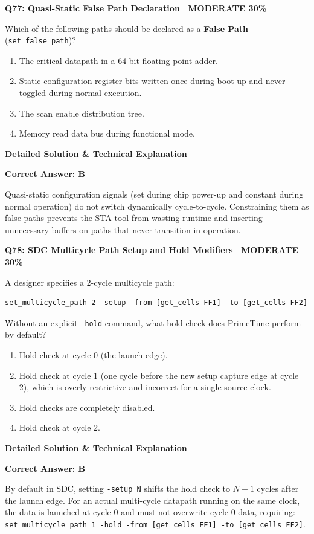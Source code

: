 \documentclass[11pt,a4paper]{article}
\newcommand{\badgemod}{{\color{white}\colorbox{modoran}{\bfseries\sffamily\tiny\ MODERATE 30\%\ }}}
\newenvironment{qbox}[2]{%
  \begin{mdframed}[style=qstyle]%
  {\bfseries\sffamily\color{primaryblue}#1 \hfill #2}\par\vspace{2pt}%
}{%
  \end{mdframed}%
}
\newenvironment{ansbox}{%
  \begin{mdframed}[style=ansstyle]%
  {\bfseries\sffamily\color{ansgreen}\small Detailed Solution \& Technical Explanation}\par\vspace{2pt}\small%
}{%
  \end{mdframed}%
}
\begin{document}
\begin{qbox}{Q77: Quasi-Static False Path Declaration}{\badgemod}
Which of the following paths should be declared as a \textbf{False Path} (\texttt{set\_false\_path})?
\begin{enumerate}[label=\textbf{\Alph*.}]
  \item The critical datapath in a 64-bit floating point adder.
  \item Static configuration register bits written once during boot-up and never toggled during normal execution.
  \item The scan enable distribution tree.
  \item Memory read data bus during functional mode.
\end{enumerate}
\end{qbox}
\begin{ansbox}
\textbf{Correct Answer: B}

Quasi-static configuration signals (set during chip power-up and constant during normal operation) do not switch dynamically cycle-to-cycle. Constraining them as false paths prevents the STA tool from wasting runtime and inserting unnecessary buffers on paths that never transition in operation.
\end{ansbox}

\begin{qbox}{Q78: SDC Multicycle Path Setup and Hold Modifiers}{\badgemod}
A designer specifies a 2-cycle multicycle path:
\begin{lstlisting}[style=tclstyle]
set_multicycle_path 2 -setup -from [get_cells FF1] -to [get_cells FF2]
\end{lstlisting}
Without an explicit \texttt{-hold} command, what hold check does PrimeTime perform by default?
\begin{enumerate}[label=\textbf{\Alph*.}]
  \item Hold check at cycle 0 (the launch edge).
  \item Hold check at cycle 1 (one cycle before the new setup capture edge at cycle 2), which is overly restrictive and incorrect for a single-source clock.
  \item Hold checks are completely disabled.
  \item Hold check at cycle 2.
\end{enumerate}
\end{qbox}
\begin{ansbox}
\textbf{Correct Answer: B}

By default in SDC, setting \texttt{-setup N} shifts the hold check to $N-1$ cycles after the launch edge. For an actual multi-cycle datapath running on the same clock, the data is launched at cycle 0 and must not overwrite cycle 0 data, requiring: \texttt{set\_multicycle\_path 1 -hold -from [get\_cells FF1] -to [get\_cells FF2]}.
\end{ansbox}
\end{document}
